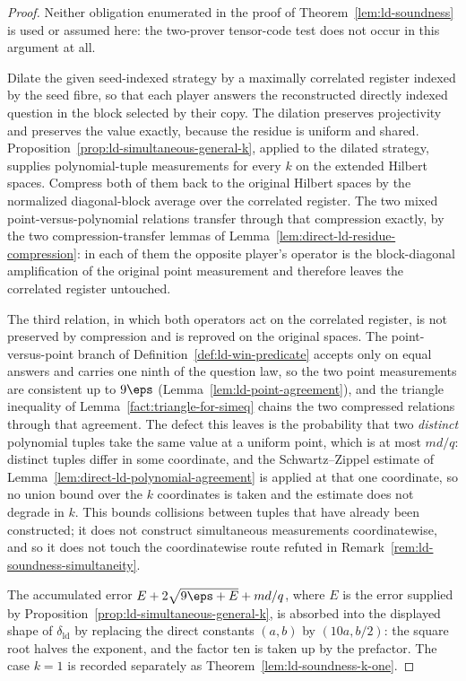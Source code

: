 \begin{proof}
	\leanok
	Neither obligation enumerated in the proof of Theorem~\ref{lem:ld-soundness} is used or assumed here: the two-prover tensor-code test does not occur in this argument at all.

	Dilate the given seed-indexed strategy by a maximally correlated register indexed by the seed fibre, so that each player answers the reconstructed directly indexed question in the block selected by their copy. The dilation preserves projectivity and preserves the value exactly, because the residue is uniform and shared. Proposition~\ref{prop:ld-simultaneous-general-k}, applied to the dilated strategy, supplies polynomial-tuple measurements for every $k$ on the extended Hilbert spaces. Compress both of them back to the original Hilbert spaces by the normalized diagonal-block average over the correlated register. The two mixed point-versus-polynomial relations transfer through that compression exactly, by the two compression-transfer lemmas of Lemma~\ref{lem:direct-ld-residue-compression}: in each of them the opposite player's operator is the block-diagonal amplification of the original point measurement and therefore leaves the correlated register untouched.

	The third relation, in which both operators act on the correlated register, is not preserved by compression and is reproved on the original spaces. The point-versus-point branch of Definition~\ref{def:ld-win-predicate} accepts only on equal answers and carries one ninth of the question law, so the two point measurements are consistent up to $9\eps$ (Lemma~\ref{lem:ld-point-agreement}), and the triangle inequality of Lemma~\ref{fact:triangle-for-simeq} chains the two compressed relations through that agreement. The defect this leaves is the probability that two \emph{distinct} polynomial tuples take the same value at a uniform point, which is at most $md/q$: distinct tuples differ in some coordinate, and the Schwartz--Zippel estimate of Lemma~\ref{lem:direct-ld-polynomial-agreement} is applied at that one coordinate, so no union bound over the $k$ coordinates is taken and the estimate does not degrade in $k$. This bounds collisions between tuples that have already been constructed; it does not construct simultaneous measurements coordinatewise, and so it does not touch the coordinatewise route refuted in Remark~\ref{rem:ld-soundness-simultaneity}.

	The accumulated error $E + 2\sqrt{9\eps + E} + md/q$, where $E$ is the error supplied by Proposition~\ref{prop:ld-simultaneous-general-k}, is absorbed into the displayed shape of $\delta_{\mathrm{ld}}$ by replacing the direct constants $(a,b)$ by $(10a, b/2)$: the square root halves the exponent, and the factor ten is taken up by the prefactor. The case $k = 1$ is recorded separately as Theorem~\ref{lem:ld-soundness-k-one}.
\end{proof}


